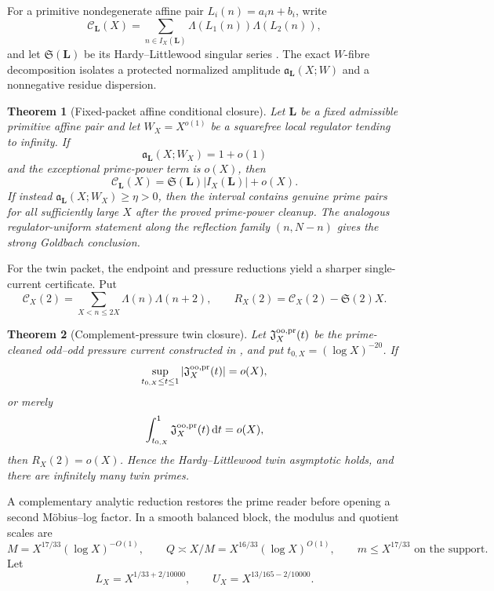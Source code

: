 \documentclass[11pt]{article}
\newtheorem{theorem}{Theorem}[section]
\theoremstyle{definition}
\theoremstyle{remark}
\newcommand{\dd}{\mathrm d}
\newcommand{\abs}[1]{\left\lvert#1\right\rvert}
\begin{document}
For a primitive nondegenerate affine pair
$L_i(n)=a_i n+b_i$, write
\[
 \mathcal C_{\bm L}(X)
 =\sum_{n\in I_X(\bm L)}\Lambda(L_1(n))\Lambda(L_2(n)),
\]
and let $\mathfrak S(\bm L)$ be its Hardy--Littlewood singular series
\cite{HardyLittlewood}.  The exact $W$-fibre decomposition isolates a
protected normalized amplitude $\mathfrak a_{\bm L}(X;W)$ and a nonnegative residue
dispersion.

\begin{theorem}[Fixed-packet affine conditional closure]
\label{thm:intro-affine-amplitude}
Let $\bm L$ be a fixed admissible primitive affine pair and let
$W_X=X^{o(1)}$ be a squarefree local regulator tending to infinity.  If
\[
 \mathfrak a_{\bm L}(X;W_X)=1+o(1)
\]
and the exceptional prime-power term is $o(X)$, then
\[
 \mathcal C_{\bm L}(X)
 =\mathfrak S(\bm L)|I_X(\bm L)|+o(X).
\]
If instead $\mathfrak a_{\bm L}(X;W_X)\ge\eta>0$, then the interval contains genuine
prime pairs for all sufficiently large $X$ after the proved prime-power
cleanup.  The analogous regulator-uniform statement along the reflection
family $(n,N-n)$ gives the strong Goldbach conclusion.
\end{theorem}

For the twin packet, the endpoint and pressure reductions yield a sharper
single-current certificate.  Put
\[
 \mathcal C_X(2)=\sum_{X<n\le2X}\Lambda(n)\Lambda(n+2),
 \qquad
 R_X(2)=\mathcal C_X(2)-\mathfrak S(2)X.
\]

\begin{theorem}[Complement-pressure twin closure]
\label{thm:intro-pressure-twin}
Let $\mathfrak J_X^{\rm oo,pr}(t)$ be the prime-cleaned odd--odd pressure
current constructed in , and put
$t_{0,X}=(\log X)^{-20}$.  If
\[
 \sup_{t_{0,X}\le t\le1}
 \abs{\mathfrak J_X^{\rm oo,pr}(t)}=o(X),
\]
or merely
\[
 \int_{t_{0,X}}^1\mathfrak J_X^{\rm oo,pr}(t)\,\dd t=o(X),
\]
then $R_X(2)=o(X)$.  Hence the Hardy--Littlewood twin asymptotic holds, and
there are infinitely many twin primes.
\end{theorem}

A complementary analytic reduction restores the prime reader before opening
a second M\"obius--log factor.  In a smooth balanced block, the modulus and
quotient scales are
\[
 M=X^{17/33}(\log X)^{-O(1)},
 \qquad Q\asymp X/M=X^{16/33}(\log X)^{O(1)},
 \qquad m\le X^{17/33}\text{ on the support}.
\]
Let
\[
 L_X=X^{1/33+2/10000},
 \qquad
 U_X=X^{13/165-2/10000}.
\]
\end{document}
